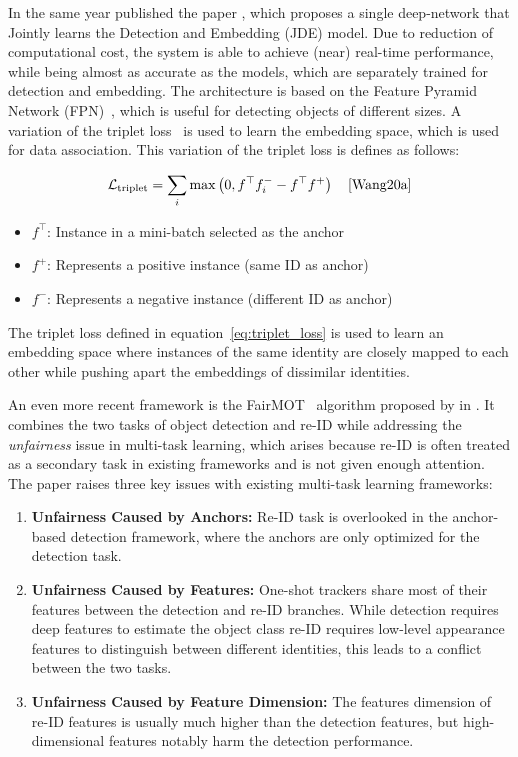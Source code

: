 In the same year \citeauthor{Wang20a} published the paper , which proposes a single deep-network that Jointly learns the Detection and Embedding (JDE) model. Due to reduction of computational cost, the system is able to achieve (near) real-time performance, while being almost as accurate as the models, which are separately trained for detection and embedding. The architecture is based on the Feature Pyramid Network (FPN)~\cite{Lin17}, which is useful for detecting objects of different sizes. A variation of the triplet loss~\cite{Schroff15} is used to learn the embedding space, which is used for data association. This variation of the triplet loss is defines as follows:

\begin{equation}
    \label{eq:triplet_loss}
    \mathcal{L}_{\text{triplet}}=\sum_i \max \left(0, f^{\top} f_i^{-}-f^{\top} f^{+}\right)
    \quad\text{\cite[Eq.~1]{Wang20a}}
\end{equation}

\begin{itemize}
    \item \(f^{\top}\): Instance in a mini-batch selected as the anchor
    \item \(f^{+}\): Represents a positive instance (same ID as anchor)
    \item \(f^{-}\): Represents a negative instance (different ID as anchor)
\end{itemize}

The triplet loss defined in equation~\ref{eq:triplet_loss} is used to learn an embedding space where instances of the same identity are closely mapped to each other while pushing apart the embeddings of dissimilar identities.

An even more recent framework is the FairMOT~\cite{Zhang21} algorithm proposed by \citeauthor{Zhang21} in \citeyear{Zhang21}. It combines the two tasks of object detection and re-ID while addressing the \textit{unfairness} issue in multi-task learning, which arises because re-ID is often treated as a secondary task in existing frameworks and is not given enough attention. The paper raises three key issues with existing multi-task learning frameworks:

\begin{enumerate}
    \item \textbf{Unfairness Caused by Anchors:} Re-ID task is overlooked in the anchor-based detection framework, where the anchors are only optimized for the detection task.
    \item \textbf{Unfairness Caused by Features:} One-shot trackers share most of their features between the detection and re-ID branches. While detection requires deep features to estimate the object class re-ID requires low-level appearance features to distinguish between different identities, this leads to a conflict between the two tasks.
    \item \textbf{Unfairness Caused by Feature Dimension:} The features dimension of re-ID features is usually much higher than the detection features, but high-dimensional features notably harm the detection performance.
\end{enumerate}


